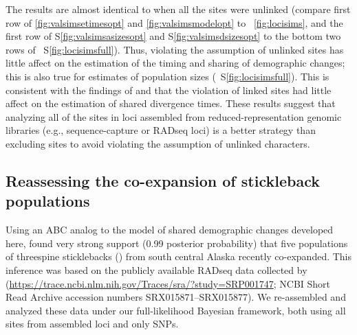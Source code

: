 The results are almost identical to when all the sites were unlinked
(compare first row of
\figs
\ref{fig:valsimsetimesopt}
and
\ref{fig:valsimsmodelopt}
to
\fig{}~\ref{fig:locisims},
and the first row of
\figs
S\ref{fig:valsimsasizesopt}
and
S\ref{fig:valsimsdsizesopt}
to the bottom two rows of
\fig{}~S\ref{fig:locisimsfull}).
Thus, violating the assumption of unlinked sites has little
affect on the estimation of the timing and sharing of
demographic changes;
this is also true for estimates of population sizes
(\fig{}~S\ref{fig:locisimsfull}).
This is consistent with the findings of
\citet{Oaks2018ecoevolity} and
\citet{Oaks2018paic}
that the violation of linked sites had little affect on the estimation of
shared divergence times.
These results suggest that analyzing all of the sites in loci assembled from
reduced-representation genomic libraries (e.g., sequence-capture or RADseq
loci) is a better strategy than excluding sites to avoid violating the
assumption of unlinked characters.

\ifembed{

}{}




\subsection{Reassessing the co-expansion of stickleback populations}

Using an ABC analog to the model of shared demographic changes developed here,
\citet{Xue2015} found very strong support (0.99 posterior probability) that
five populations of threespine sticklebacks ()
from south central Alaska recently
co-expanded.
This inference was based on the publicly available RADseq data collected by
\citet{Hohenlohe2010}
(\url{https://trace.ncbi.nlm.nih.gov/Traces/sra/?study=SRP001747};
NCBI Short Read Archive accession numbers SRX015871--SRX015877).
We re-assembled and analyzed these data under our full-likelihood
Bayesian framework, both using all sites from assembled loci
and only SNPs.


